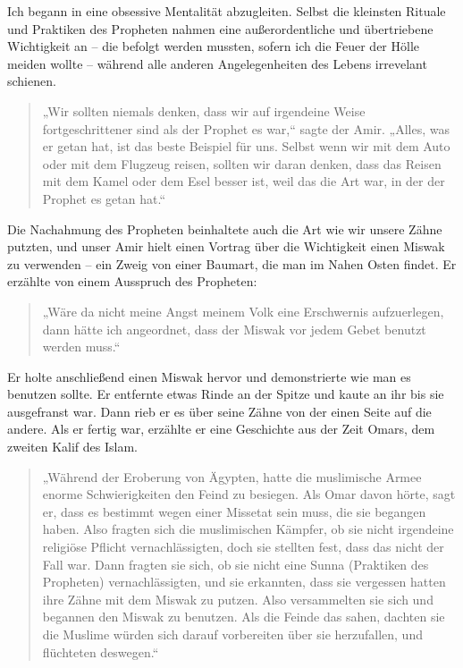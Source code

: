 \documentclass[12pt]{memoir}
\begin{document}
Ich begann in eine obsessive Mentalität abzugleiten.
Selbst die kleinsten Rituale und Praktiken des Propheten
nahmen eine außerordentliche und übertriebene Wichtigkeit an –
die befolgt werden mussten, sofern ich die Feuer der Hölle meiden wollte –
während alle anderen Angelegenheiten des Lebens irrevelant schienen.

\begin{quote}
„Wir sollten niemals denken,
dass wir auf irgendeine Weise fortgeschrittener sind als der Prophet es war,“
sagte der Amir.
„Alles, was er getan hat, ist das beste Beispiel für uns.
Selbst wenn wir mit dem Auto oder mit dem Flugzeug reisen,
sollten wir daran denken,
dass das Reisen mit dem Kamel oder dem Esel besser ist,
weil das die Art war, in der der Prophet es getan hat.“
\end{quote}

Die Nachahmung des Propheten beinhaltete auch die Art
wie wir unsere Zähne putzten,
und unser Amir hielt einen Vortrag über die Wichtigkeit
einen Miswak zu verwenden – ein Zweig von einer Baumart,
die man im Nahen Osten findet.
Er erzählte von einem Ausspruch des Propheten:

\begin{quote}
„Wäre da nicht meine Angst meinem Volk eine Erschwernis aufzuerlegen,
dann hätte ich angeordnet,
dass der Miswak vor jedem Gebet benutzt werden muss.“
\end{quote}

Er holte anschließend einen Miswak hervor und demonstrierte
wie man es benutzen sollte.
Er entfernte etwas Rinde an der Spitze
und kaute an ihr bis sie ausgefranst war.
Dann rieb er es über seine Zähne von der einen Seite auf die andere.
Als er fertig war, erzählte er eine Geschichte aus der Zeit Omars,
dem zweiten Kalif des Islam.

\begin{quote}
„Während der Eroberung von Ägypten,
hatte die muslimische Armee enorme Schwierigkeiten den Feind zu besiegen.
Als Omar davon hörte, sagt er, dass es bestimmt wegen einer Missetat sein muss,
die sie begangen haben.
Also fragten sich die muslimischen Kämpfer,
ob sie nicht irgendeine religiöse Pflicht vernachlässigten,
doch sie stellten fest, dass das nicht der Fall war.
Dann fragten sie sich, ob sie nicht eine Sunna
(Praktiken des Propheten) vernachlässigten, und sie erkannten,
dass sie vergessen hatten ihre Zähne mit dem Miswak zu putzen.
Also versammelten sie sich und begannen den Miswak zu benutzen.
Als die Feinde das sahen, dachten sie die Muslime würden sich
darauf vorbereiten über sie herzufallen, und flüchteten deswegen.“
\end{quote}
\end{document}
